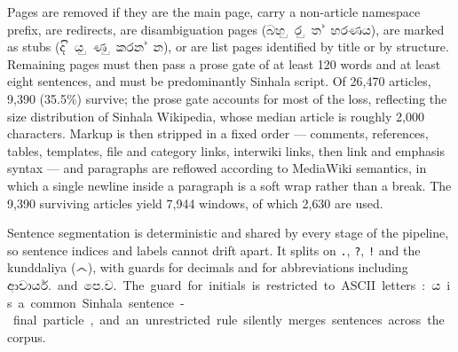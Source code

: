 Pages are removed if they are the main page, carry a non-article namespace
prefix, are redirects, are disambiguation pages (\si{බහුරුත්හරණය}), are marked
as stubs (\si{දියුණු කරන්න}), or are list pages identified by title or by
structure. Remaining pages must then pass a prose gate of at least 120 words and
at least eight sentences, and must be predominantly Sinhala script. Of 26{,}470
articles, 9{,}390 (35.5\%) survive; the prose gate accounts for most of the
loss, reflecting the size distribution of Sinhala Wikipedia, whose median
article is roughly 2{,}000 characters. Markup is then stripped in a fixed
order --- comments, references, tables, templates, file and category links,
interwiki links, then link and emphasis syntax --- and paragraphs are reflowed
according to MediaWiki semantics, in which a single newline inside a paragraph
is a soft wrap rather than a break. The 9{,}390 surviving articles yield 7{,}944
windows, of which 2{,}630 are used.

Sentence segmentation is deterministic and shared by every stage of the
pipeline, so sentence indices and labels cannot drift apart. It splits on
\texttt{.}, \texttt{?}, \texttt{!} and the kunddaliya (\si{෴}), with guards for
decimals and for abbreviations including \si{ආචාර්ය.} and \si{පෙ.ව.} The guard
for initials is restricted to ASCII letters: \si{ය} is a common Sinhala
sentence-final particle, and an unrestricted rule silently merges sentences
across the corpus.
